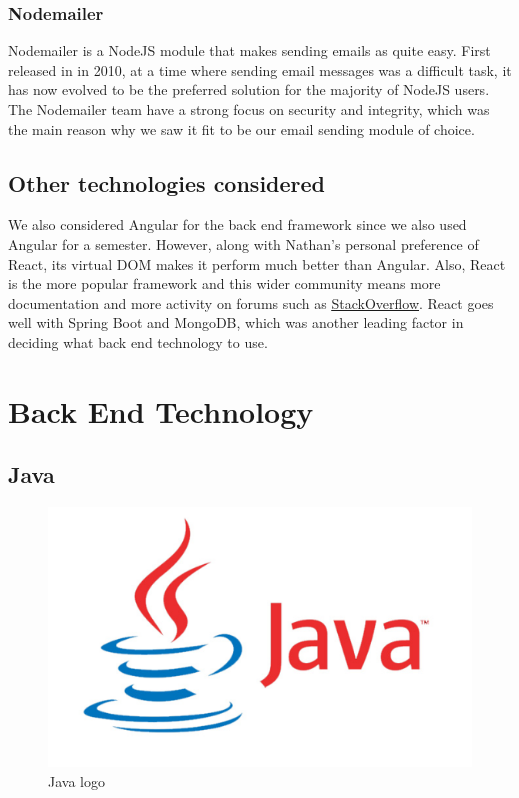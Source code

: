 \subsubsection{Nodemailer}
Nodemailer is a NodeJS module that makes sending emails as quite easy. First released in in 2010, at a time where sending email messages was a difficult task, it has now evolved to be the preferred solution for the majority of NodeJS users.
The Nodemailer team have a strong focus on security and integrity, which was the main reason why we saw it fit to be our email sending module of choice.

\subsection{Other technologies considered}
We also considered Angular for the back end framework since we also used Angular for a semester. However, along with Nathan's personal preference of React, its virtual DOM makes it perform much better than Angular. Also, React is the more popular framework and this wider community means more documentation and more activity on forums such as \underline{\href{https://stackoverflow.com}{StackOverflow}}. React goes well with Spring Boot and MongoDB, which was another leading factor in deciding what back end technology to use. \par

\section{Back End Technology}

\subsection{Java}
\begin{figure}[th]
\renewcommand\thefigure{3.2}
\centering
\includegraphics[scale = 0.31]{img/java-logo-1.png}
\caption{Java logo}
\label{Java}
\end{figure}
\newpage

